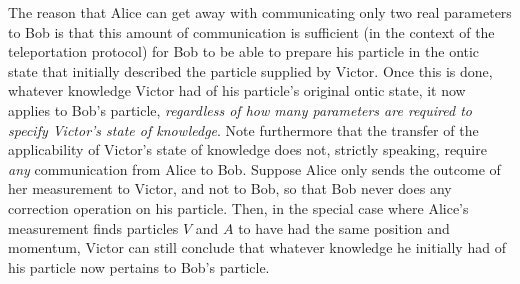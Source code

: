 \documentclass[pra,superscriptaddress,nofootinbib,12pt]{revtex4-2}
\begin{document}
The reason that Alice can get away with communicating only two real parameters to Bob is that this amount of communication is sufficient (in the context of the teleportation protocol) for Bob to be able to prepare his particle in the ontic state that initially described the particle supplied by Victor. Once this is done, whatever knowledge Victor had of his particle's original ontic state, it now applies to Bob's particle, \emph{regardless of how many parameters are required to specify Victor's state of knowledge}.  Note furthermore that the transfer of the applicability of Victor's state of knowledge does not, strictly speaking, require \emph{any} communication from Alice to Bob. Suppose Alice only sends the outcome of her measurement to Victor, and not to Bob, so that Bob never does any correction operation on his particle.  Then, in the special case where Alice's measurement finds particles $V$ and $A$ to have had the same position and momentum, Victor can still conclude that whatever knowledge he initially had of his particle now pertains to Bob's particle.



\end{document}
